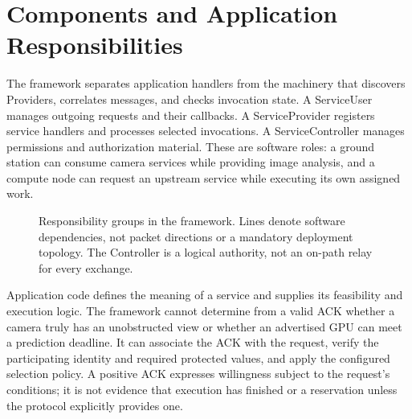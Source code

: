 \section{Components and Application Responsibilities}
The framework separates application handlers from the machinery that discovers Providers, correlates messages, and checks invocation state. A ServiceUser manages outgoing requests and their callbacks. A ServiceProvider registers service handlers and processes selected invocations. A ServiceController manages permissions and authorization material. These are software roles: a ground station can consume camera services while providing image analysis, and a compute node can request an upstream service while executing its own assigned work.

\begin{figure}[htbp]\singlespacing\centering
{}
\caption{Responsibility groups in the framework. Lines denote software dependencies, not packet directions or a mandatory deployment topology. The Controller is a logical authority, not an on-path relay for every exchange.}
\end{figure}

Application code defines the meaning of a service and supplies its feasibility and execution logic. The framework cannot determine from a valid ACK whether a camera truly has an unobstructed view or whether an advertised GPU can meet a prediction deadline. It can associate the ACK with the request, verify the participating identity and required protected values, and apply the configured selection policy. A positive ACK expresses willingness subject to the request's conditions; it is not evidence that execution has finished or a reservation unless the protocol explicitly provides one.

